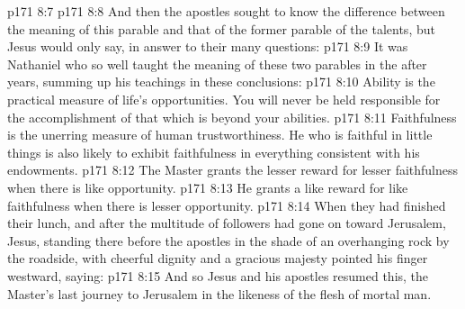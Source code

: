 \vs p171 8:7 
\vs p171 8:8 \pc And then the apostles sought to know the difference between the meaning of this parable and that of the former parable of the talents, but Jesus would only say, in answer to their many questions: 
\vs p171 8:9 It was Nathaniel who so well taught the meaning of these two parables in the after years, summing up his teachings in these conclusions:
\vs p171 8:10 \bibnobreakspace Ability is the practical measure of life’s opportunities. You will never be held responsible for the accomplishment of that which is beyond your abilities.
\vs p171 8:11 \bibnobreakspace Faithfulness is the unerring measure of human trustworthiness. He who is faithful in little things is also likely to exhibit faithfulness in everything consistent with his endowments.
\vs p171 8:12 \bibnobreakspace The Master grants the lesser reward for lesser faithfulness when there is like opportunity.
\vs p171 8:13 \bibnobreakspace He grants a like reward for like faithfulness when there is lesser opportunity.
\vs p171 8:14 \pc When they had finished their lunch, and after the multitude of followers had gone on toward Jerusalem, Jesus, standing there before the apostles in the shade of an overhanging rock by the roadside, with cheerful dignity and a gracious majesty pointed his finger westward, saying: 
\vs p171 8:15 And so Jesus and his apostles resumed this, the Master’s last journey to Jerusalem in the likeness of the flesh of mortal man.
\quizlink
